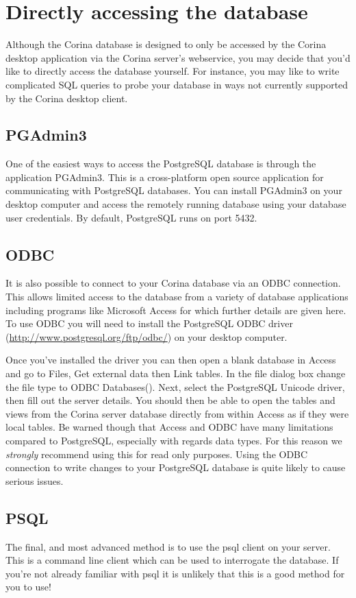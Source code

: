 
\section{Directly accessing the database}

Although the Corina database is designed to only be accessed by the Corina desktop application via the Corina server's webservice, you may decide that you'd like to directly access the database yourself.  For instance, you may like to write complicated SQL queries to probe your database in ways not currently supported by the Corina desktop client. 


\subsection{PGAdmin3}
One of the easiest ways to access the PostgreSQL database is through the application PGAdmin3.  This is a cross-platform open source application for communicating with PostgreSQL databases.  You can install PGAdmin3 on your desktop computer and access the remotely running database using your database user credentials.  By default, PostgreSQL runs on port 5432.


\subsection{ODBC}
It is also possible to connect to your Corina database via an ODBC connection.  This allows limited access to the database from a variety of database applications including programs like Microsoft Access for which further details are given here.   To use ODBC you will need to install the PostgreSQL ODBC driver (\url{http://www.postgresql.org/ftp/odbc/}) on your desktop computer.

Once you've installed the driver you can then open a blank database in Access and go to Files, Get external data then Link tables.  In the file dialog box change the file type to ODBC Databases().  Next, select the PostgreSQL Unicode driver, then fill out the server details.  You should then be able to open the tables and views from the Corina server database directly from within Access as if they were local tables.  Be warned though that Access and ODBC have many limitations compared to PostgreSQL, especially with regards data types.  For this reason we \emph{strongly} recommend using this for read only purposes.  Using the ODBC connection to write changes to your PostgreSQL database is quite likely to cause serious issues. 


\subsection{PSQL}
The final, and most advanced method is to use the psql client on your server.  This is a command line client which can be used to interrogate the database.  If you're not already familiar with psql it is unlikely that this is a good method for you to use!